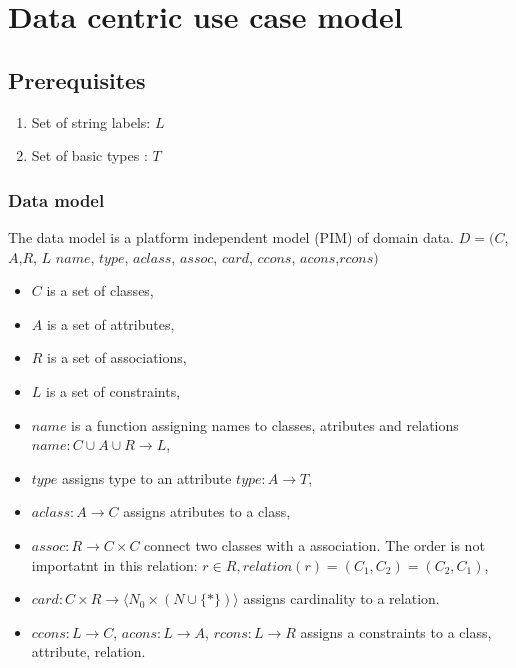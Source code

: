 \documentclass[10pt,a4paper]{article}
\begin{document}
\section{Data centric use case model}
\subsection{Prerequisites} 

\begin{enumerate}
	\item Set of string labels: $L$ 
	\item Set of basic types : $T$ 
\end{enumerate}

\subsubsection{Data model}
The data model is a platform independent model (PIM) of domain data.
$D = ( C$,$ A$,$ R$, $L$ $name$, $type$, $aclass$, $assoc$, $card$, $ccons$, $acons$,$rcons)$
\begin{itemize}
	\item $C$ is a set of classes,
	\item $A$ is a set of attributes,
	\item $R$ is a set of associations,
	\item $L$ is a set of constraints,
	\item $name$ is a function assigning names to classes, atributes and relations $name: C \cup A \cup R \rightarrow L$,
	\item $type$ assigns type to an attribute $type: A \rightarrow T$,
	\item $aclass: A \rightarrow C$ assigns atributes to a class,
	\item $assoc: R \rightarrow C \times C$ connect two classes with a association. The order is not importatnt in this relation: $r \in R, relation(r)=(C_1, C_2)=(C_2, C_1)$,
	\item $card: C \times R \rightarrow \langle N_0 \times (N \cup \lbrace * \rbrace) \rangle$ assigns cardinality to a relation.
	\item $ccons: L \rightarrow C$, $acons: L \rightarrow A$, $rcons: L \rightarrow R$ assigns a constraints to a class, attribute, relation.
\end{itemize}
\end{document}
